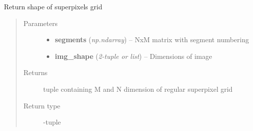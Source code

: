 \documentclass[letterpaper,10pt,english]{sphinxmanual}
\begin{document}

\begin{fulllineitems}
\label{segmentation:flamingo.segmentation.superpixels.get_superpixel_grid}
Return shape of superpixels grid
\begin{quote}\begin{description}
\item[{Parameters}] \leavevmode\begin{itemize}
\item {} 
\textbf{segments} (\emph{np.ndarray}) -- NxM matrix with segment numbering

\item {} 
\textbf{img\_shape} (\emph{2-tuple or list}) -- Dimensions of image

\end{itemize}

\item[{Returns}] \leavevmode
tuple containing M and N dimension of regular superpixel grid

\item[{Return type}] -tuple

\end{description}\end{quote}

\end{fulllineitems}

\end{document}
